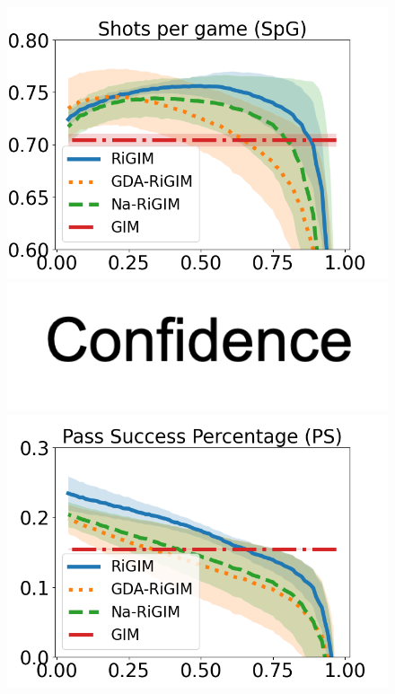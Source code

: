 \documentclass{article}
\begin{document}
\begin{figure}[htbp]
\begin{minipage}{0.16\textwidth}
    \includegraphics[scale=0.14]{figures/soccer_risk_curve_SpG_shadow.png}\par
    \vspace{-0.05in}
    \includegraphics[scale=0.12]{figures/confidence_x_label.png}
    \end{minipage}
    \begin{minipage}{0.16\textwidth}
    \centering
    \includegraphics[scale=0.14]{figures/soccer_risk_curve_PS_shadow.png}\par

\end{minipage}
\end{figure}
\end{document}
